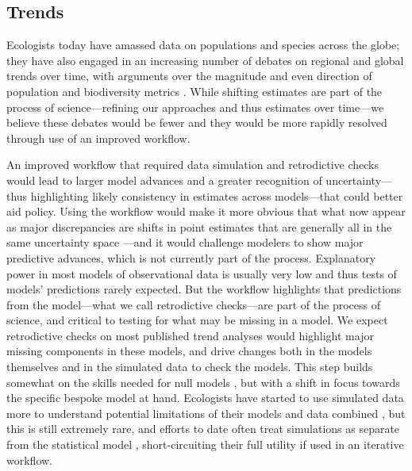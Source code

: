 \documentclass[11pt]{article}
\begin{document}
\subsection{Trends}

Ecologists today have amassed data on populations and species across the globe; they have also engaged in an increasing number of debates on regional and global trends over time, with arguments over the magnitude and even direction of population and biodiversity metrics \citep{Dornelas2014,Leung2020,terry2022no,muller2024weather}. While shifting estimates are part of the process of science---refining our approaches and thus estimates over time---we believe these debates would be fewer and they would be more rapidly resolved through use of an improved workflow. %

An improved workflow that required data simulation and retrodictive checks would lead to larger model advances and a greater recognition of uncertainty---thus highlighting likely consistency in estimates across models---that could better aid policy.  Using the workflow would make it more obvious that what now appear as major discrepancies are shifts in point estimates that are generally all in the same uncertainty space \citep{Johnson2024}---and it would challenge modelers to show major predictive advances, which is not currently part of the process. Explanatory power in most models of observational data is usually very low \citep{low2014rising,moller2002much} and thus tests of models' predictions rarely expected. But the workflow highlights that predictions from the model---what we call retrodictive checks---are part of the process of science, and critical to testing for what may be missing in a model. We expect retrodictive checks on most published trend analyses would highlight major missing components in these models, and drive changes both in the models themselves and in the simulated data to check the models. This step builds somewhat on the skills needed for null models \citep{Gotelli:2012oz}, but with a shift in focus towards the specific bespoke model at hand. Ecologists have started to use simulated data more to understand potential limitations of their models and data combined \citep{Hilborn1997}, but this is still extremely rare, and efforts to date often treat simulations as separate from the statistical model \citep{Buschke2021,dove2023quantifying}, short-circuiting their full utility if used in an iterative workflow.
\end{document}
